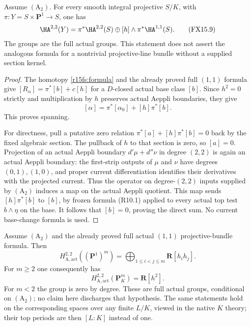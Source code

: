 \begin{corollary}
\label{r15fs:product-formula}
Assume $(\mathrm A_2)$. For every smooth integral projective
$S/K$, with $\pi:Y=S\times\mathbf P^1\to S$, one has
\[
 \HA^{2,2}(Y)=\pi^*\HA^{2,2}(S)
                       \oplus[h]\wedge\pi^*\HA^{1,1}(S).
\tag{FX15.9}\label{r15fs:full-product}
\]
The groups are the full actual groups. This statement
does not assert the analogous formula for a nontrivial
projective-line bundle without a supplied section kernel.
\end{corollary}

\begin{proof}
The homotopy \eqref{r15fs:formula} and the already proved
full $(1,1)$ formula give
$[R_\alpha]=\pi^*[b]+c[h]$ for a $D$-closed actual
base class $[b]$. Since $h^2=0$ strictly and multiplication
by $h$ preserves actual Aeppli boundaries, they give
\[
                 [\alpha]=\pi^*[\alpha_0]+[h]\pi^*[b].
\]
This proves spanning.

For directness, pull a putative zero relation
$\pi^*[a]+[h]\pi^*[b]=0$ back by the fixed algebraic
section. The pullback of $h$ to that section is zero,
so $[a]=0$. Projection of an actual Aeppli boundary
$d'\mu+d''\nu$ in degree $(2,2)$ is again an actual
Aeppli boundary: the first-strip outputs of $\mu$ and
$\nu$ have degrees $(0,1),(1,0)$, and proper current
differentiation identifies their derivatives with the
projected current. Thus the operator on degree-$(2,2)$
inputs supplied by $(\mathrm A_2)$ induces a map on the actual Aeppli
quotient. This map sends $[h]\pi^*[b]$ to $[b]$,
by frozen formula (R10.1) applied to every actual
top test $b\wedge\eta$ on the base. It follows that
$[b]=0$, proving the direct sum. No current base-change
formula is used.
\end{proof}

\begin{corollary}
\label{r15fs:projective-space}
Assume $(\mathrm A_2)$ and the already proved full actual
$(1,1)$ projective-bundle formula. Then
\[
 H_{\mathrm A,\mathrm{act}}^{2,2}((\mathbf P^1)^m)
       =\bigoplus_{1\leq i<j\leq m}\mathbf R[h_i h_j].
\tag{FX15.5}\label{r15fs:product}
\]
For $m\geq2$ one consequently has
\[
 H_{\mathrm A,\mathrm{act}}^{2,2}(\mathbf P^m_K)
                              =\mathbf R[h^2].
\tag{FX15.6}\label{r15fs:space}
\]
For $m<2$ the group is zero by degree. These are full
actual groups, conditional on $(\mathrm A_2)$; no
claim here discharges that hypothesis. The same statements
hold on the corresponding spaces over any finite $L/K$,
viewed in the native $K$ theory; their top periods are
then $[L:K]$ instead of one.
\end{corollary}


